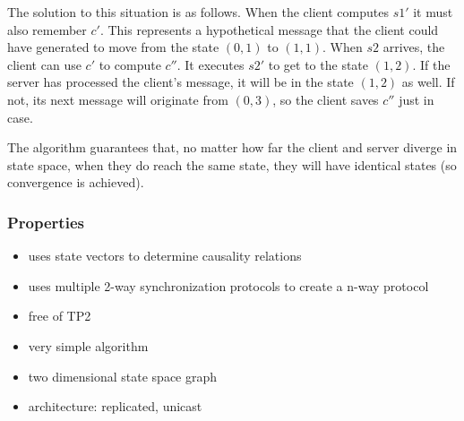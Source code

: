 The solution to this situation is as follows. When the client computes $s1'$ it must also remember $c'$. This represents a hypothetical message that the client could have generated to move from the state $(0,1)$ to $(1,1)$. When $s2$ arrives, the client can use $c'$ to compute $c''$. It executes $s2'$ to get to the state $(1,2)$. If the server has processed the client's message, it will be in the state $(1,2)$ as well. If not, its next message will originate from $(0,3)$, so the client saves $c''$ just in case.

The algorithm guarantees that, no matter how far the client and server diverge in state space, when they do reach the same state, they will have identical states (so convergence is achieved).


\subsubsection{Properties}
\begin{itemize}
 \item uses state vectors to determine causality relations
 \item uses multiple 2-way synchronization protocols to create a n-way protocol
 \item free of TP2
 \item very simple algorithm
 \item two dimensional state space graph
 \item architecture: replicated, unicast
\end{itemize}
